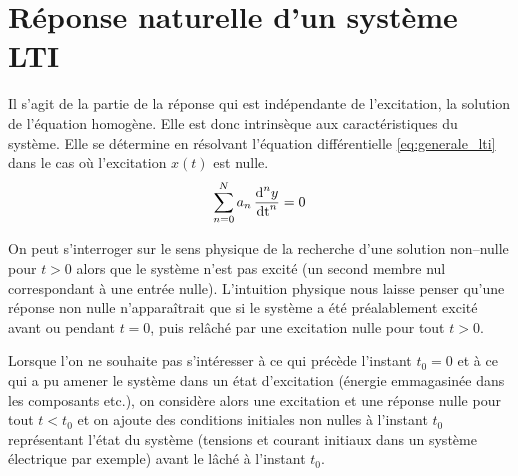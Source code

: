 	\section{Réponse naturelle d'un système LTI}
	Il s'agit de la partie de la réponse qui est indépendante de
        l'excitation, \cad{} la solution de l'équation homogène. Elle
        est donc intrinsèque aux caractéristiques du système. Elle se
        détermine en résolvant l'équation différentielle
        \ref{eq:generale_lti} dans le cas où l'excitation $x(t)$ est
        nulle.
	\begin{equation}\label{eq:reponse_naturelle}
          \sum_{n=0}^N a_{n}\, \frac{\mathrm{d{}}^{n}y}{{\mathrm{d{t}}}^{n}} = 0
	\end{equation}

        \begin{remarque}
          On peut s'interroger sur le sens physique de la recherche
          d'une solution non--nulle pour $t>0$ alors que le système
          n'est pas excité (un second membre nul correspondant à une
          entrée nulle). L'intuition physique nous laisse penser
          qu'une réponse non nulle n'apparaîtrait que si le système a
          été préalablement excité avant ou pendant $t = 0$, puis \og
          relâché \fg{} par une excitation nulle pour tout $t>0$.

          Lorsque l'on ne souhaite pas s'intéresser à ce qui précède
          l'instant $t_0=0$ et à ce qui a pu amener le système dans un
          état d'excitation (énergie emmagasinée dans les composants
          etc.), on considère alors une excitation et une réponse
          nulle pour tout $t<t_0$ et on ajoute des conditions
          initiales non nulles à l'instant $t_0$ représentant l'état
          du système (tensions et courant initiaux dans un système
          électrique par exemple) avant le lâché à l'instant $t_0$.
      \end{remarque}

        

